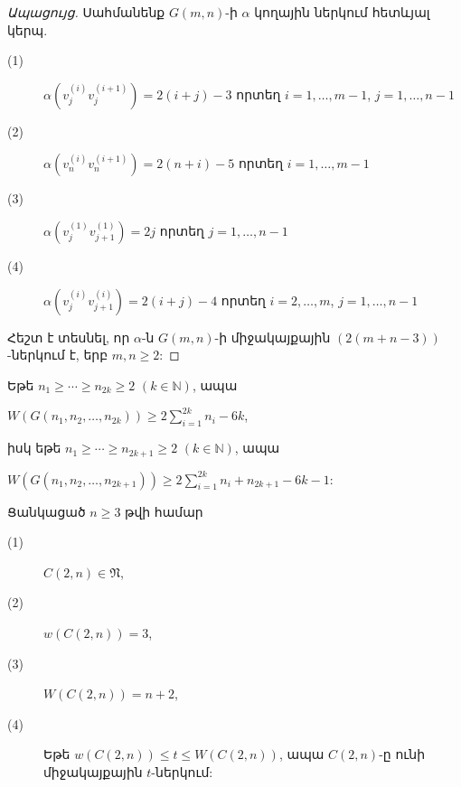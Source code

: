 \begin{hide}
\begin{proof}[Ապացույց]
Սահմանենք $G(m,n)$-ի $\alpha$ կողային ներկում հետևյալ կերպ.
\begin{description}
\item[(1)] 
$\alpha\left(v_{j}^{(i)}v_{j}^{(i+1)}\right)=2(i+j)-3$ 
որտեղ $i=1,\ldots,m-1$, $j=1,\ldots,n-1$

\item[(2)] 
$\alpha\left(v_{n}^{(i)}v_{n}^{(i+1)}\right)=2(n+i)-5$
որտեղ $i=1,\ldots,m-1$

\item[(3)] 
$\alpha\left(v_{j}^{(1)}v_{j+1}^{(1)}\right)=2j$
որտեղ $j=1,\ldots,n-1$

\item[(4)] 
$\alpha\left(v_{j}^{(i)}v_{j+1}^{(i)}\right)=2(i+j)-4$
 որտեղ $i=2,\ldots,m$, $j=1,\ldots,n-1$
\end{description}

Հեշտ է տեսնել, որ $\alpha$-ն $G(m,n)$-ի միջակայքային $(2(m+n-3))$-ներկում է, երբ $m,n\geq 2$:
\end{proof}

\begin{corollary}
\label{t2_n_grid_W} Եթե $n_{1}\geq\cdots \geq n_{2k}\geq 2$ $(k\in \mathbb{N})$, ապա
\begin{center}
$W(G(n_{1},n_{2},\ldots,n_{2k}))\geq 2\sum_{i=1}^{2k}n_{i}-6k$,
\end{center}
իսկ եթե $n_{1}\geq\cdots \geq n_{2k+1}\geq 2$ $(k\in \mathbb{N})$, ապա
\begin{center}
$W(G(n_{1},n_{2},\ldots,n_{2k+1}))\geq
2\sum_{i=1}^{2k}n_{i}+n_{2k+1}-6k-1$:
\end{center}
\end{corollary}

\begin{theorem}\cite{Kchoyan2010} 
\label{t2_Khchoyan} Ցանկացած $n\geq 3$ թվի համար
\begin{description}
\item[(1)] $C(2,n)\in \mathfrak{N}$,

\item[(2)] $w\left(C(2,n)\right)=3$,

\item[(3)] $W\left(C(2,n)\right)=n+2$,

\item[(4)] Եթե $w\left(C(2,n)\right)\leq t\leq W\left(C(2,n)\right)$, ապա $C(2,n)$-ը ունի միջակայքային $t$-ներկում:
\end{description}
\end{theorem}
\end{hide}


